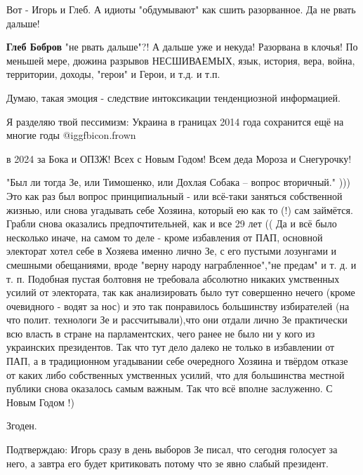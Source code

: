 \begin{itemize}
\begin{itemize}
Вот - Игорь и Глеб. А идиоты "обдумывают" как сшить разорванное. Да не рвать дальше!

\textbf{Глеб Бобров} "не рвать дальше"?!
А дальше уже и некуда!
Разорвана в клочья!
По меньшей мере, дюжина разрывов НЕСШИВАЕМЫХ, язык, история, вера, война, территории, доходы, "герои" и Герои, и т.д. и т.п.

Думаю, такая эмоция - следствие интоксикации тенденциозной информацией.

\end{itemize} %

Я разделяю твой пессимизм: Украина в границах 2014 года сохранится ещё на многие годы  @igg{fbicon.frown} 

в 2024 за Бока и ОПЗЖ! Всех с Новым Годом! Всем деда Мороза и Снегурочку!


"Был ли тогда Зе, или Тимошенко, или Дохлая Собака – вопрос вторичный." ))) Это
как раз был вопрос принципиальный - или всё-таки заняться собственной
жизнью, или снова угадывать себе Хозяина, который ею как то (!) сам займётся.
Грабли снова оказались предпочтительней, как и все 29 лет (( Да и всё было
несколько иначе, на самом то деле - кроме избавления от ПАП, основной электорат
хотел себе в Хозяева именно лично Зе, с его пустыми лозунгами и смешными
обещаниями, вроде "верну народу награбленное","не предам" и т. д. и т. п. Подобная
пустая болтовня не требовала абсолютно никаких умственных усилий от
электората, так как анализировать было тут совершенно нечего (кроме очевидного -
водят за нос) и это так понравилось большинству избирателей (на что
полит. технологи Зе и рассчитывали),что они отдали лично Зе практически всю
власть в стране на парламентских, чего ранее не было ни у кого из украинских
президентов. Так что тут дело далеко не только в избавлении от ПАП, а в
традиционном угадывании себе очередного Хозяина и твёрдом отказе от каких либо
собственных умственных усилий, что для большинства местной публики снова
оказалось самым важным. Так что всё вполне заслуженно. С Новым Годом !)

\begin{itemize} %
Згоден.
\end{itemize} %


Подтверждаю: Игорь сразу в день выборов Зе писал, что сегодня голосует за него,
а завтра его будет критиковать потому что зе явно слабый президент.


\end{itemize}
